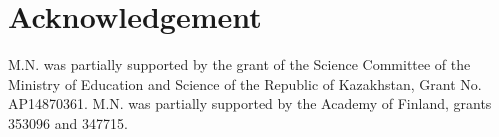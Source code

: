 \documentclass[12pt,a4paper]{amsart}
\numberwithin{equation}{section}
\theoremstyle{plain}
\theoremstyle{definition}
\begin{document}

\section{Acknowledgement}
M.N. was partially supported by the grant of the Science Committee of the Ministry of Education and Science of the Republic of Kazakhstan, Grant No. AP14870361. M.N. was partially supported by the Academy of Finland, grants 353096 and 347715.





\setlength{\parskip}{0pt}



















\end{document}

